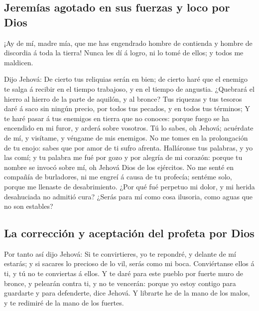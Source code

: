 \hypertarget{jeremuxedas-agotado-en-sus-fuerzas-y-loco-por-dios}{%
\subsection{Jeremías agotado en sus fuerzas y loco por
Dios}\label{jeremuxedas-agotado-en-sus-fuerzas-y-loco-por-dios}}

 ¡Ay de mí, madre mía, que me has engendrado hombre de
contienda y hombre de discordia á toda la tierra! Nunca les dí á logro,
ni lo tomé de ellos; y todos me maldicen.

 Dijo Jehová: De cierto tus reliquias serán en bien; de
cierto haré que el enemigo te salga á recibir en el tiempo trabajoso, y
en el tiempo de angustia.  ¿Quebrará el hierro al hierro de
la parte de aquilón, y al bronce?  Tus riquezas y tus
tesoros daré á saco sin ningún precio, por todos tus pecados, y en todos
tus términos;  Y te haré pasar á tus enemigos en tierra que
no conoces: porque fuego se ha encendido en mi furor, y arderá sobre
vosotros.  Tú lo sabes, oh Jehová; acuérdate de mí, y
visítame, y véngame de mis enemigos. No me tomes en la prolongación de
tu enojo: sabes que por amor de ti sufro afrenta. 
Halláronse tus palabras, y yo las comí; y tu palabra me fué por gozo y
por alegría de mi corazón: porque tu nombre se invocó sobre mí, oh
Jehová Dios de los ejércitos.  No me senté en compañía de
burladores, ni me engreí á causa de tu profecía; sentéme solo, porque me
llenaste de desabrimiento.  ¿Por qué fué perpetuo mi dolor,
y mi herida desahuciada no admitió cura? ¿Serás para mí como cosa
ilusoria, como aguas que no son estables?

\hypertarget{la-correcciuxf3n-y-aceptaciuxf3n-del-profeta-por-dios}{%
\subsection{La corrección y aceptación del profeta por
Dios}\label{la-correcciuxf3n-y-aceptaciuxf3n-del-profeta-por-dios}}

 Por tanto así dijo Jehová: Si te convirtieres, yo te
repondré, y delante de mí estarás; y si sacares lo precioso de lo vil,
serás como mi boca. Conviértanse ellos á ti, y tú no te conviertas á
ellos.  Y te daré para este pueblo por fuerte muro de
bronce, y pelearán contra ti, y no te vencerán: porque yo estoy contigo
para guardarte y para defenderte, dice Jehová.  Y librarte
he de la mano de los malos, y te redimiré de la mano de los fuertes.

